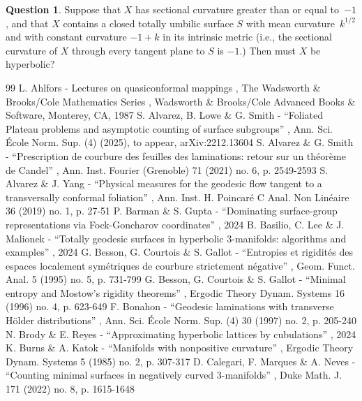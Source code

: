 \documentclass[11pt]{article}
\newcommand{\ie}{i.e.,\xspace}
\theoremstyle{plain}
\theoremstyle{definition}
\newtheorem{question}[theorem]{Question}
\begin{document}
\begin{question}
Suppose that $X$ has sectional curvature greater than or equal to~$-1$, and that $X$ contains a closed totally umbilic surface $S$ with mean curvature~$k^{1/2}$ and with constant curvature $-1 +k$ in its intrinsic metric (\ie the sectional curvature of $X$ through every tangent plane to $S$ is $-1$.) Then must $X$ be hyperbolic?
\end{question}


\begin{thebibliography}{99}
 L. Ahlfors - Lectures on quasiconformal mappings , The Wadsworth \& Brooks/Cole Mathematics Series , Wadsworth \& Brooks/Cole Advanced Books \& Software, Monterey, CA, 1987
 S. Alvarez, B. Lowe \& G. Smith - “Foliated Plateau problems and asymptotic counting of surface subgroups” , Ann. Sci. École Norm. Sup. (4) (2025), to appear, arXiv:2212.13604
 S. Alvarez \& G. Smith - “Prescription de courbure des feuilles des laminations: retour sur un théorème de Candel” , Ann. Inst. Fourier (Grenoble) 71 (2021) no. 6, p. 2549-2593
 S. Alvarez \& J. Yang - “Physical measures for the geodesic flow tangent to a transversally conformal foliation” , Ann. Inst. H. Poincaré C Anal. Non Linéaire 36 (2019) no. 1, p. 27-51
 P. Barman \& S. Gupta - “Dominating surface-group representations via Fock-Goncharov coordinates” , 2024
 B. Basilio, C. Lee \& J. Malionek - “Totally geodesic surfaces in hyperbolic 3-manifolds: algorithms and examples” , 2024
 G. Besson, G. Courtois \& S. Gallot - “Entropies et rigidités des espaces localement symétriques de courbure strictement négative” , Geom. Funct. Anal. 5 (1995) no. 5, p. 731-799
 G. Besson, G. Courtois \& S. Gallot - “Minimal entropy and Mostow’s rigidity theorems” , Ergodic Theory Dynam. Systems 16 (1996) no. 4, p. 623-649
 F. Bonahon - “Geodesic laminations with transverse Hölder distributions” , Ann. Sci. École Norm. Sup. (4) 30 (1997) no. 2, p. 205-240
 N. Brody \& E. Reyes - “Approximating hyperbolic lattices by cubulations” , 2024
 K. Burns \& A. Katok - “Manifolds with nonpositive curvature” , Ergodic Theory Dynam. Systems 5 (1985) no. 2, p. 307-317
 D. Calegari, F. Marques \& A. Neves - “Counting minimal surfaces in negatively curved 3-manifolds” , Duke Math. J. 171 (2022) no. 8, p. 1615-1648

\end{thebibliography}
\end{document}
